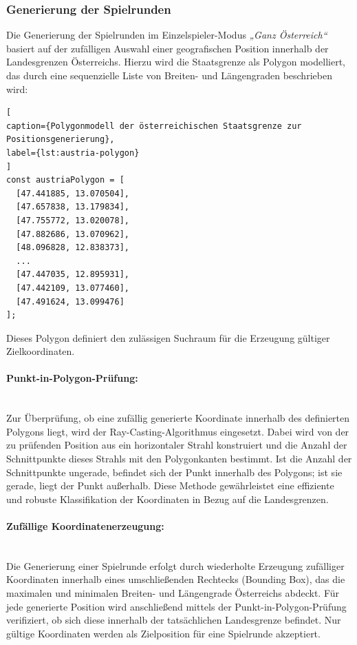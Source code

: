 \subsubsection{Generierung der Spielrunden}

Die Generierung der Spielrunden im Einzelspieler-Modus \emph{„Ganz Österreich“} basiert auf der zufälligen Auswahl einer geografischen Position innerhalb der Landesgrenzen Österreichs. 
Hierzu wird die Staatsgrenze als Polygon modelliert, das durch eine sequenzielle Liste von Breiten- und Längengraden beschrieben wird:
\begin{lstlisting}[
caption={Polygonmodell der österreichischen Staatsgrenze zur Positionsgenerierung},
label={lst:austria-polygon}
]
const austriaPolygon = [
  [47.441885, 13.070504],
  [47.657838, 13.179834],
  [47.755772, 13.020078],
  [47.882686, 13.070962],
  [48.096828, 12.838373],
  ...
  [47.447035, 12.895931],
  [47.442109, 13.077460],
  [47.491624, 13.099476]
];
\end{lstlisting}
Dieses Polygon definiert den zulässigen Suchraum für die Erzeugung gültiger Zielkoordinaten.

\paragraph{Punkt-in-Polygon-Prüfung: }
\mbox{}\\
Zur Überprüfung, ob eine zufällig generierte Koordinate innerhalb des definierten Polygons liegt, wird der Ray-Casting-Algorithmus eingesetzt. 
Dabei wird von der zu prüfenden Position aus ein horizontaler Strahl konstruiert und die Anzahl der Schnittpunkte dieses Strahls mit den Polygonkanten bestimmt. 
Ist die Anzahl der Schnittpunkte ungerade, befindet sich der Punkt innerhalb des Polygons; ist sie gerade, liegt der Punkt außerhalb. 
Diese Methode gewährleistet eine effiziente und robuste Klassifikation der Koordinaten in Bezug auf die Landesgrenzen.

\paragraph{Zufällige Koordinatenerzeugung: }
\mbox{}\\
Die Generierung einer Spielrunde erfolgt durch wiederholte Erzeugung zufälliger Koordinaten innerhalb eines umschließenden Rechtecks (Bounding Box), das die maximalen und minimalen Breiten- und Längengrade Österreichs abdeckt. 
Für jede generierte Position wird anschließend mittels der Punkt-in-Polygon-Prüfung verifiziert, ob sich diese innerhalb der tatsächlichen Landesgrenze befindet. 
Nur gültige Koordinaten werden als Zielposition für eine Spielrunde akzeptiert.

